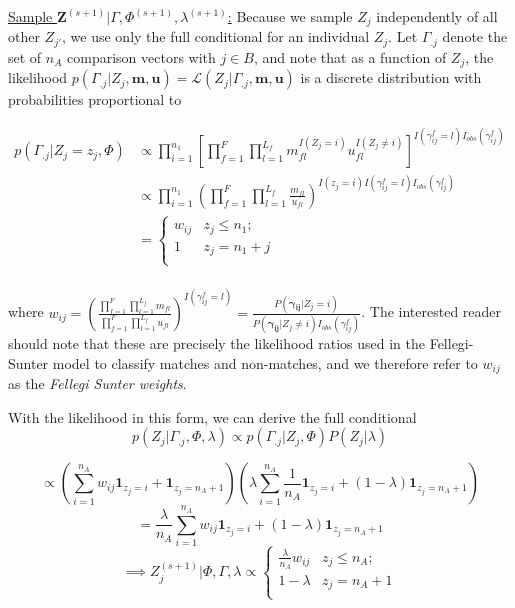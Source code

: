 \documentclass[12pt,letterpaper]{article}
\newcommand{\1}[1]{\mathbb{I}\!\left[#1\right]} %
\begin{document}
{\underline{Sample $\mathbf{Z}^{(s+1)}|\Gamma, \Phi^{(s+1)}, \lambda^{(s+1)}$:}
Because we sample \(Z_j\) independently of all other \(Z_{j'}\), we use
only the full conditional for an individual \(Z_j\). Let \(\Gamma_{.j}\)
denote the set of \(n_A\) comparison vectors with \(j \in B\), and note
that as a function of \(Z_j\), the likelihood
\(p(\Gamma_{.j}|Z_j, \mathbf{m}, \mathbf{u}) = \mathcal{L}(Z_j|\Gamma_{.j}, \mathbf{m}, \mathbf{u})\)
is a discrete distribution with probabilities proportional to

\begin{align*}
	p(\Gamma_{.j}|Z_j = z_j, \Phi) &\propto \prod_{i=1}^{n_1}\left[\prod_{f=1}^{F}\prod_{l=1}^{L_f} m_{fl}^{I(Z_j = i)}u_{fl}^{I(Z_j \neq i)}\right]^{I(\gamma_{ij}^f = l)I_{obs}(\gamma_{ij}^f)}\\
	&\propto \prod_{i=1}^{n_1}\left(\prod_{f=1}^{F}\prod_{l=1}^{L_f} \frac{m_{fl}}{u_{fl}}\right)^{I(z_j = i) I(\gamma_{ij}^f = l)I_{obs}(\gamma_{ij}^f)} \\
	&=
	\begin{cases} 
		w_{ij}  & z_j \leq n_1; \\
		1 &  z_j  = n_1 + j \\
	\end{cases}\\
\end{align*}

where
\(w_{ij} = \left(\frac{\prod_{f=1}^{F}\prod_{l=1}^{L_f} m_{fl}}{\prod_{f=1}^{F}\prod_{l=1}^{L_f} u_{fl}}\right)^{I(\gamma_{ij}^f = l)} = \frac{P(\boldsymbol{\gamma_{ij}}|Z_j = i)}{P(\boldsymbol{\gamma_{ij}} |Z_j \neq i)I_{obs}(\gamma_{ij}^f)}\).
The interested reader should note that these are precisely the
likelihood ratios used in the Fellegi-Sunter model to classify matches
and non-matches, and we therefore refer to \(w_{ij}\) as the
\emph{Fellegi Sunter weights}.

With the likelihood in this form, we can derive the full conditional
\[p(Z_j|\Gamma_{.j}, \Phi, \lambda) \propto p(\Gamma_{.j}| Z_j, \Phi) P(Z_j|\lambda)\]

\[\propto \left(\sum_{i=1}^{n_A}w_{ij}\mathbf{1}_{z_j = i} + \mathbf{1}_{z_j = n_A + 1}\right)\left(\lambda\sum_{i=1}^{n_A}\frac{1}{n_A}\mathbf{1}_{z_j = i} + (1-\lambda)\mathbf{1}_{z_j = n_A + 1}\right)\]
\[= \frac{\lambda}{n_A}\sum_{i=1}^{n_A}w_{ij}\mathbf{1}_{z_j = i} + (1-\lambda)\mathbf{1}_{z_j = n_A + 1} \]
\[ \implies Z_j^{(s+1)} | \Phi, \Gamma, \lambda \propto
\begin{cases} 
	\frac{\lambda}{n_A}w_{ij}   & z_j \leq n_A; \\
	1-\lambda &  z_j  = n_A + 1 \\
\end{cases}\]

}
\end{document}

